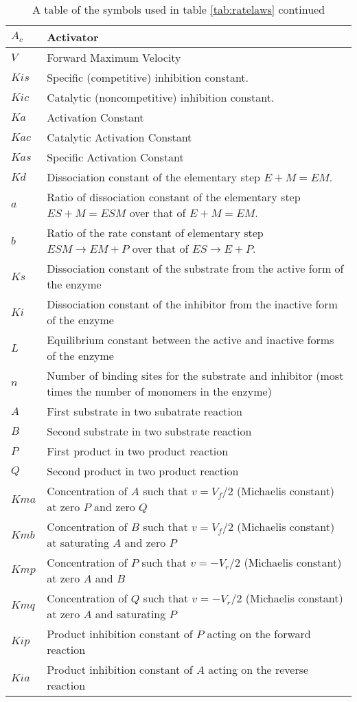 \documentclass[10pt]{article}
\begin{document}
\begin{table}[h]
\begin{tabular}{|p{2cm}|p{14cm}|}
\hline
$A_c    $&      Activator \\ \hline
$V     $&        Forward Maximum Velocity \\ \hline
$Kis   $&      Specific (competitive) inhibition constant. \\ \hline
$Kic   $&      Catalytic (noncompetitive) inhibition constant. \\ \hline
$Ka    $&      Activation Constant \\ \hline
$Kac   $&     Catalytic Activation Constant \\ \hline
$Kas   $&     Specific Activation Constant \\ \hline
$Kd    $&     Dissociation constant of the elementary step $E + M = EM$. \\ \hline
$a     $&        Ratio of dissociation constant of the elementary step $ES + M = ESM$ over that of $E + M = EM$. \\ \hline
$b     $&        Ratio of the rate constant of elementary step $ESM \rightarrow EM + P$ over that of $ES \rightarrow E + P$. \\ \hline
$Ks    $&      Dissociation constant of the substrate from the active form of the enzyme \\ \hline
$Ki    $&       Dissociation constant of the inhibitor from the inactive form of the enzyme \\ \hline
$L     $&        Equilibrium constant between the active and inactive forms of the enzyme \\ \hline
$n     $&       Number of binding sites for the substrate and inhibitor (most times the number of monomers in the enzyme) \\ \hline
$A     $&      First substrate in two subatrate reaction \\ \hline
$B      $&      Second substrate in two substrate reaction \\ \hline
$P      $&      First product in two product reaction \\ \hline
$Q      $&     Second product in two product reaction \\ \hline
$Kma    $&  Concentration of $A$ such that $v = V_f/2$  (Michaelis constant) at zero $P$ and zero $Q$ \\ \hline
$Kmb   $&   Concentration of $B$ such that $v = V_f/2$  (Michaelis constant) at saturating $A$ and zero $P$ \\ \hline
$Kmp   $&   Concentration of $P$ such that $v = -V_r/2$  (Michaelis constant) at zero $A$ and $B$ \\ \hline
$Kmq   $&   Concentration of $Q$ such that $v = -V_r/2$  (Michaelis constant) at zero $A$ and saturating $P$ \\ \hline
$Kip   $&    Product inhibition constant of $P$ acting on the forward reaction \\ \hline
$Kia   $&     Product inhibition constant of $A$ acting on the reverse reaction \\ \hline
\end{tabular}
\caption{A table of the symbols used in table \ref{tab:ratelaws} continued}
\end{table}
\end{document}

